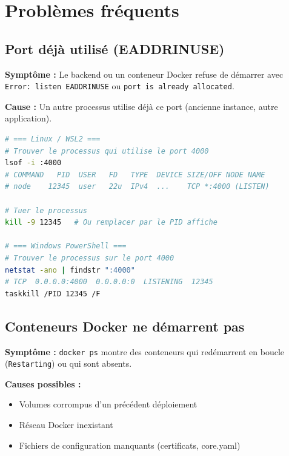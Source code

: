 \documentclass[12pt,a4paper,twoside]{report}
\begin{document}
\section{Problèmes fréquents}

\subsection{Port déjà utilisé (EADDRINUSE)}

\textbf{Symptôme :} Le backend ou un conteneur Docker refuse de démarrer avec \texttt{Error: listen EADDRINUSE} ou \texttt{port is already allocated}.

\textbf{Cause :} Un autre processus utilise déjà ce port (ancienne instance, autre application).

\begin{lstlisting}[language=bash, caption=Trouver et libérer un port occupé]
# === Linux / WSL2 ===
# Trouver le processus qui utilise le port 4000
lsof -i :4000
# COMMAND   PID  USER   FD   TYPE  DEVICE SIZE/OFF NODE NAME
# node    12345  user   22u  IPv4  ...    TCP *:4000 (LISTEN)

# Tuer le processus
kill -9 12345   # Ou remplacer par le PID affiche

# === Windows PowerShell ===
# Trouver le processus sur le port 4000
netstat -ano | findstr ":4000"
# TCP  0.0.0.0:4000  0.0.0.0:0  LISTENING  12345
taskkill /PID 12345 /F
\end{lstlisting}

\subsection{Conteneurs Docker ne démarrent pas}

\textbf{Symptôme :} \texttt{docker ps} montre des conteneurs qui redémarrent en boucle (\texttt{Restarting}) ou qui sont absents.

\textbf{Causes possibles :}
\begin{itemize}
    \item Volumes corrompus d'un précédent déploiement
    \item Réseau Docker inexistant
    \item Fichiers de configuration manquants (certificats, core.yaml)
\end{itemize}
\end{document}
